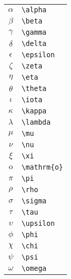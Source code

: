\begin{table}[h]
\begin{minipage}[t]{0.28\textwidth}
	\end{minipage}
	\qquad
	\begin{minipage}[t]{0.28\textwidth}
		\centering
		\begin{tabular}{c l}
			\hline
			$\alpha$      & \verb|\alpha|                    \\
			$\beta$       & \verb|\beta|                     \\
			$\gamma$      & \verb|\gamma|                    \\
			$\delta$      & \verb|\delta|                    \\
			$\epsilon$    & \verb|\epsilon|                  \\
			$\zeta$       & \verb|\zeta|                     \\
			$\eta$        & \verb|\eta|                      \\
			$\theta$      & \verb|\theta|                    \\
			$\iota$       & \verb|\iota|                     \\
			$\kappa$      & \verb|\kappa|                    \\
			$\lambda$     & \verb|\lambda|                   \\
			$\mu$         & \verb|\mu|                       \\
			$\nu$         & \verb|\nu|                       \\
			$\xi$         & \verb|\xi|                       \\
			$\mathrm{o}$  & \verb|\mathrm{o}|                \\
			$\pi$         & \verb|\pi|                       \\
			$\rho$        & \verb|\rho|                      \\
			$\sigma$      & \verb|\sigma|                    \\
			$\tau$        & \verb|\tau|                      \\
			$\upsilon$    & \verb|\upsilon|                  \\
			$\phi$        & \verb|\phi|                      \\
			$\chi$        & \verb|\chi|                      \\
			$\psi$        & \verb|\psi|                      \\
			$\omega$      & \verb|\omega|                    \\
			\hline
		\end{tabular}
	\end{minipage}
\end{table}

